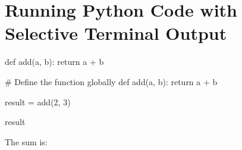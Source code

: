 \documentclass{article}
\begin{document}
\section{Running Python Code with Selective Terminal Output}

\begin{pyverbatim}
def add(a, b):
    return a + b
\end{pyverbatim}

\begin{pycode}
# Define the function globally
def add(a, b):
    return a + b
\end{pycode}
    
\begin{pycode}
result = add(2, 3)
\end{pycode}

\begin{pyconsole}
result
\end{pyconsole}

The sum is: 
\end{document}
